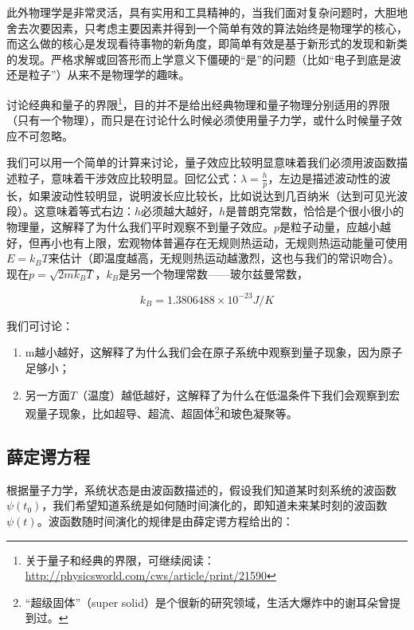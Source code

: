此外物理学是非常灵活，具有实用和工具精神的，当我们面对复杂问题时，大胆地舍去次要因素，只考虑主要因素并得到一个简单有效的算法始终是物理学的核心，而这么做的核心是发现看待事物的新角度，即简单有效是基于新形式的发现和新类的发现。严格求解或回答形而上学意义下僵硬的“是”的问题（比如“电子到底是波还是粒子”）从来不是物理学的趣味。

讨论经典和量子的界限\footnote{关于量子和经典的界限，可继续阅读：\url{http://physicsworld.com/cws/article/print/21590}}，目的并不是给出经典物理和量子物理分别适用的界限（只有一个物理），而只是在讨论什么时候必须使用量子力学，或什么时候量子效应不可忽略。

我们可以用一个简单的计算来讨论，量子效应比较明显意味着我们必须用波函数描述粒子，意味着干涉效应比较明显。回忆公式：$\lambda = \frac{h}{p}$，左边是描述波动性的波长，如果波动性较明显，说明波长应比较长，比如说达到几百纳米（达到可见光波段）。这意味着等式右边：$h$必须越大越好，$h$是普朗克常数，恰恰是个很小很小的物理量，这解释了为什么我们平时观察不到量子效应。$p$是粒子动量，应越小越好，但再小也有上限，宏观物体普遍存在无规则热运动，无规则热运动能量可使用$E=k_B T$来估计（即温度越高，无规则热运动越激烈，这也与我们的常识吻合）。现在$p= \sqrt{2 m k_B T}$，$k_B$是另一个物理常数——玻尔兹曼常数，

\begin{equation}
k_B = 1.3806488 \times 10^{-23} J/K
\end{equation}

我们可讨论：

\begin{enumerate}
\item 

m越小越好，这解释了为什么我们会在原子系统中观察到量子现象，因为原子足够小；

\item

另一方面$T$（温度）越低越好，这解释了为什么在低温条件下我们会观察到宏观量子现象，比如超导、超流、超固体\footnote{“超级固体”（super solid）是个很新的研究领域，生活大爆炸中的谢耳朵曾提到过。}和玻色凝聚等。

\end{enumerate}

\subsection{薛定谔方程}

根据量子力学，系统状态是由波函数描述的，假设我们知道某时刻系统的波函数$\psi(t_0)$，我们希望知道系统是如何随时间演化的，即知道未来某时刻的波函数$\psi(t)$。波函数随时间演化的规律是由薛定谔方程给出的：

